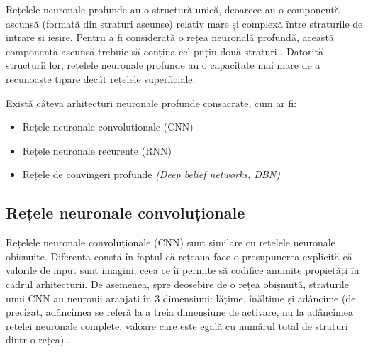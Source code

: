 \documentclass[a4paper,12pt]{report}
\begin{document}
Rețelele neuronale profunde au o structură unică, 
deoarece au o componentă ascunsă (formată din straturi ascunse) 
relativ mare și complexă între straturile de intrare și ieșire. 
Pentru a fi considerată o rețea neuronală profundă, 
această componentă ascunsă trebuie să conțină cel puțin două straturi \cite{Tehnici-de-inteligență-computațională-Aplicații-în-electronică-și-biomedicină}.
Datorită structurii lor, rețelele neuronale profunde au o capacitate 
mai mare de a recunoaște tipare decât rețelele superficiale.

Există câteva arhitecturi neuronale profunde consacrate, cum ar fi:
\begin{itemize}
    \item Rețele neuronale convoluționale (CNN)
    \item Rețele neuronale recurente (RNN)
    \item Rețele de convingeri profunde \emph{(Deep belief networks, DBN)}
\end{itemize}

\subsection{Rețele neuronale convoluționale}
Rețelele neuronale convoluționale (CNN) sunt similare cu rețelele neuronale obișnuite.
Diferența constă în faptul că rețeaua face o presupunerea explicită că valorile 
de input sunt imagini, ceea ce îi permite să codifice anumite propietăți în 
cadrul arhitecturii. De asemenea, spre deosebire de o rețea obișnuită,
straturile unui CNN au neuronii aranjați în 3 dimensiuni: lățime, înălțime și 
adâncime (de precizat, adâncimea se referă la a treia dimensiune de activare, nu la
adâncimea rețelei neuronale complete, valoare care este egală cu numărul total de straturi
dintr-o rețea) \cite{WEBSITE:cnn-for-visual-recognition}.

\end{document}
